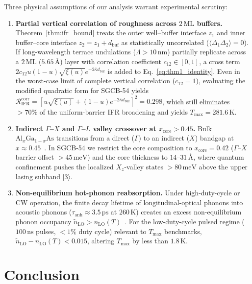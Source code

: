 \documentclass[11pt,letterpaper]{article}
\begin{document}
Three physical assumptions of our analysis warrant experimental scrutiny:
\begin{enumerate}
    \item \textbf{Partial vertical correlation of roughness across $2\,\mathrm{ML}$ buffers.} Theorem~\ref{thm:ifr_bound} treats the outer well--buffer interface $z_1$ and inner buffer--core interface $z_2 = z_1 + d_{\mathrm{buf}}$ as statistically uncorrelated ($\langle\Delta_1 \Delta_2\rangle = 0$). If long-wavelength terrace undulations ($\Lambda > 10\,\mathrm{nm}$) partially replicate across a $2\,\mathrm{ML}$ ($5.65$\,\AA) layer with correlation coefficient $c_{12} \in [0, 1]$, a cross term $2 c_{12} u(1-u)\sqrt{\xi(u)} e^{-2\bar{\kappa} d_{\mathrm{buf}}}$ is added to Eq.~\eqref{eq:thm1_identity}. Even in the worst-case limit of complete vertical correlation ($c_{12} = 1$), evaluating the modified quadratic form for SGCB-54 yields $\mathcal{R}_{\mathrm{IFR}}^{\mathrm{corr}} = [u\sqrt{\xi(u)} + (1-u)e^{-2\bar{\kappa} d_{\mathrm{buf}}}]^2 = 0.298$, which still eliminates $>70\%$ of the uniform-barrier IFR broadening and yields $T_{\max} = 281.6\,\mathrm{K}$.
    \item \textbf{Indirect $\Gamma$--$X$ and $\Gamma$--$L$ valley crossover at $x_{\mathrm{core}} > 0.45$.} Bulk $\mathrm{Al}_x\mathrm{Ga}_{1-x}\mathrm{As}$ transitions from a direct ($\Gamma$) to an indirect ($X$) bandgap at $x \approx 0.45$~\cite{Vurgaftman2001}. In SGCB-54 we restrict the core composition to $x_{\mathrm{core}} = 0.42$ ($\Gamma$--$X$ barrier offset $> 45\,\mathrm{meV}$) and the core thickness to $14\text{--}31$\,\AA, where quantum confinement pushes the localized $X_z$-valley states $> 80\,\mathrm{meV}$ above the upper lasing subband $|3\rangle$.
    \item \textbf{Non-equilibrium hot-phonon reabsorption.} Under high-duty-cycle or CW operation, the finite decay lifetime of longitudinal-optical phonons into acoustic phonons ($\tau_{\mathrm{anh}} \approx 3.5\,\mathrm{ps}$ at $260\,\mathrm{K}$) creates an excess non-equilibrium phonon occupancy $\tilde{n}_{\mathrm{LO}} > n_{\mathrm{LO}}(T)$~\cite{Iotti2001,Vurgaftman2021}. For the low-duty-cycle pulsed regime ($100\,\mathrm{ns}$ pulses, $<1\%$ duty cycle) relevant to $T_{\max}$ benchmarks, $\tilde{n}_{\mathrm{LO}} - n_{\mathrm{LO}}(T) < 0.015$, altering $T_{\max}$ by less than $1.8\,\mathrm{K}$.
\end{enumerate}

\section{Conclusion}
\label{sec:conclusion}
\end{document}
